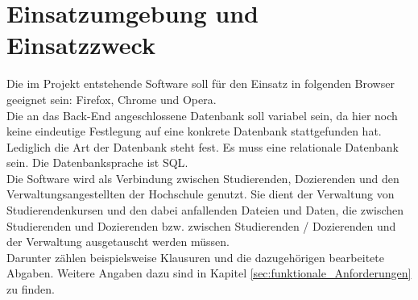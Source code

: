 
\chapter{Einsatzumgebung und Einsatzzweck}
Die im Projekt entstehende Software soll für den Einsatz in folgenden Browser geeignet sein: Firefox, Chrome und Opera. \\
Die an das \gls{Back-End} angeschlossene Datenbank soll variabel sein, da hier noch keine eindeutige Festlegung auf eine konkrete Datenbank stattgefunden hat. Lediglich die Art der Datenbank steht fest. Es muss eine \gls{relationale Datenbank} sein. Die Datenbanksprache ist \gls{SQL}.\\

Die Software wird als Verbindung zwischen \gls{Studierende}n, \gls{Dozierende}n und den \gls{Verwaltungsangestellte}n der Hochschule genutzt. Sie dient der Verwaltung von \gls{Studierendenkurs}en und den dabei anfallenden Dateien und Daten, die zwischen \gls{Studierende}n und \gls{Dozierende}n bzw. zwischen \gls{Studierende}n / \gls{Dozierende}n und der Verwaltung ausgetauscht werden müssen. \\
Darunter zählen beispielsweise Klausuren und die dazugehörigen \gls{bearbeitete} Abgaben. Weitere Angaben dazu sind in Kapitel \ref{sec:funktionale_Anforderungen} zu finden. 
